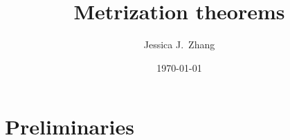 \documentclass{article}
\title{Metrization theorems}
\author{Jessica J.~Zhang}
\date{\today}
\begin{document}
\maketitle

\section{Preliminaries}
\end{document}
